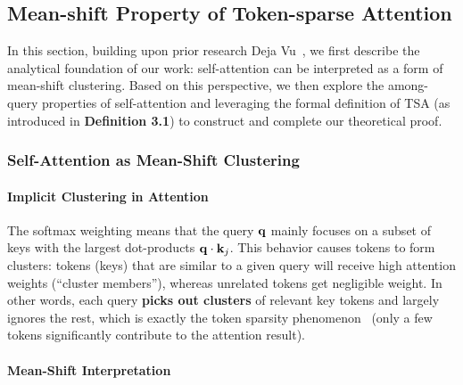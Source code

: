 \subsection{Mean-shift Property of Token-sparse Attention}
\label{sec:mean-shift}

In this section, building upon prior research Deja Vu~\cite{liu2023deja}, we first describe the analytical foundation of our work: self-attention can be interpreted as a form of mean-shift clustering. Based on this perspective, we then explore the among-query properties of self-attention and leveraging the formal definition of TSA (as introduced in \textbf{Definition 3.1}) to construct and complete our theoretical proof.

\subsubsection{Self-Attention as Mean-Shift Clustering}


\paragraph{Implicit Clustering in Attention} The softmax weighting means that the query $\mathbf{q}$ mainly focuses on a subset of keys with the largest dot-products $\mathbf{q} \cdot \mathbf{k}_j$. This behavior causes tokens to form clusters: tokens (keys) that are similar to a given query will receive high attention weights (“cluster members”), whereas unrelated tokens get negligible weight. In other words, each query \textbf{picks out clusters} of relevant key tokens and largely ignores the rest, which is exactly the token sparsity phenomenon~\cite{zhang2023h2o,tang2406quest} (only a few tokens significantly contribute to the attention result).



\paragraph{Mean-Shift Interpretation} 

